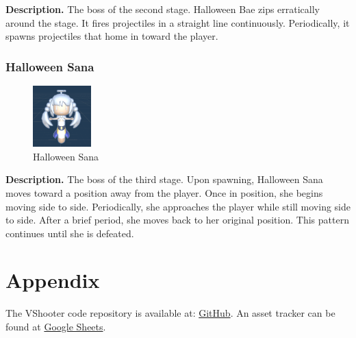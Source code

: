 \documentclass[10pt, a4paper]{article}
\begin{document}
\begin{multicols}{2}
	\textbf{Description.} The boss of the second stage. Halloween Bae zips erratically around the stage. It fires projectiles in a straight line continuously. Periodically, it spawns projectiles that home in toward the player.

	\subsubsection{Halloween Sana}

	\begin{figure}[H]
		\centering
		\includegraphics[width=0.2\textwidth]{images/halloween_sana1.png}
		\caption{Halloween Sana}
		\label{fig:halloweensana}
	\end{figure}

	\textbf{Description.} The boss of the third stage. Upon spawning, Halloween Sana moves toward a position away from the player. Once in position, she begins moving side to side. Periodically, she approaches the player while still moving side to side. After a brief period, she moves back to her original position. This pattern continues until she is defeated.

	\section{Appendix}

	The VShooter code repository is available at: \href{https://github.com/giociudadano/VShooter.git}{GitHub}. An asset tracker can be found at \href{https://docs.google.com/spreadsheets/d/1iixa0Slci229xnzVG4J9bXTK8P0FVPwnDIEXkRsuH7s/edit?usp=sharing}{Google Sheets}.

	\end{multicols}
\end{document}
